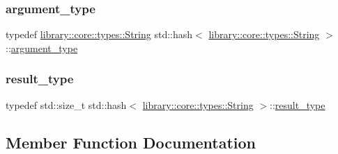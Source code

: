 \subsubsection{\texorpdfstring{argument\+\_\+type}{argument\_type}}
{\footnotesize\ttfamily typedef \hyperlink{classlibrary_1_1core_1_1types_1_1String}{library\+::core\+::types\+::\+String} std\+::hash$<$ \hyperlink{classlibrary_1_1core_1_1types_1_1String}{library\+::core\+::types\+::\+String} $>$\+::\hyperlink{structstd_1_1hash_3_01library_1_1core_1_1types_1_1String_01_4_a02e9e2783fae71235bd5239d3b8cab75}{argument\+\_\+type}}

\mbox{\label{structstd_1_1hash_3_01library_1_1core_1_1types_1_1String_01_4_a7c325dc55fee13f3b845ef9c8946a597}} 
\subsubsection{\texorpdfstring{result\+\_\+type}{result\_type}}
{\footnotesize\ttfamily typedef std\+::size\+\_\+t std\+::hash$<$ \hyperlink{classlibrary_1_1core_1_1types_1_1String}{library\+::core\+::types\+::\+String} $>$\+::\hyperlink{structstd_1_1hash_3_01library_1_1core_1_1types_1_1String_01_4_a7c325dc55fee13f3b845ef9c8946a597}{result\+\_\+type}}



\subsection{Member Function Documentation}
\mbox{\label{structstd_1_1hash_3_01library_1_1core_1_1types_1_1String_01_4_a71f1e3f818bf4b3f30bc3245bfd6843e}} 
